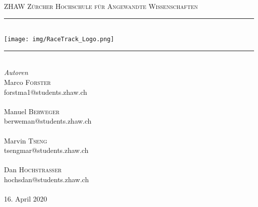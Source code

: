 \begin{titlepage} %
	\newcommand{\HRule}{\rule{\linewidth}{0.2mm}} %
	
	\center %
	
	\textsc{\LARGE ZHAW Zürcher Hochschule für Angewandte Wissenschaften}\\[1.5cm] %
	
	\HRule\\[0.6cm]
	\texttt{[image: img/RaceTrack\_Logo.png]}
	\HRule\\[1.5cm]
	
	{\large\textit{Autoren}}\\[0.6cm]
	Marco \textsc{Forster}\\ %
	forstma1@students.zhaw.ch\\~\\
	Manuel \textsc{Berweger}\\ %
	berweman@students.zhaw.ch\\~\\
	Marvin \textsc{Tseng}\\ %
	tsengmar@students.zhaw.ch\\~\\
	Dan \textsc{Hochstrasser}\\ %
	hochsdan@students.zhaw.ch\\~\\
	
	\vfill\vfill\vfill %
	{\large16. April 2020} %
	

\end{titlepage}
